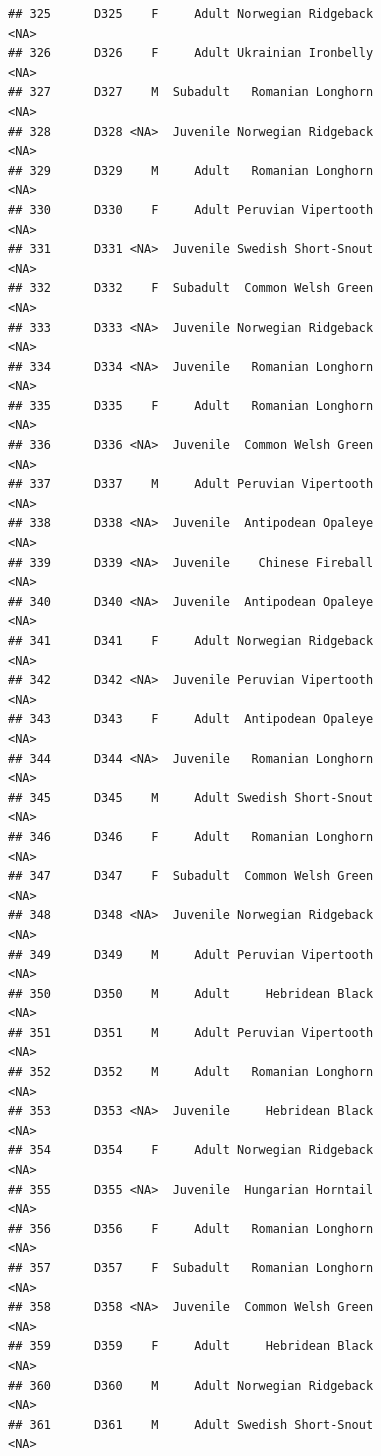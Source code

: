 \documentclass[
]{book}
\begin{document}
\begin{verbatim}
## 325      D325    F     Adult Norwegian Ridgeback                <NA>
## 326      D326    F     Adult Ukrainian Ironbelly                <NA>
## 327      D327    M  Subadult   Romanian Longhorn                <NA>
## 328      D328 <NA>  Juvenile Norwegian Ridgeback                <NA>
## 329      D329    M     Adult   Romanian Longhorn                <NA>
## 330      D330    F     Adult Peruvian Vipertooth                <NA>
## 331      D331 <NA>  Juvenile Swedish Short-Snout                <NA>
## 332      D332    F  Subadult  Common Welsh Green                <NA>
## 333      D333 <NA>  Juvenile Norwegian Ridgeback                <NA>
## 334      D334 <NA>  Juvenile   Romanian Longhorn                <NA>
## 335      D335    F     Adult   Romanian Longhorn                <NA>
## 336      D336 <NA>  Juvenile  Common Welsh Green                <NA>
## 337      D337    M     Adult Peruvian Vipertooth                <NA>
## 338      D338 <NA>  Juvenile  Antipodean Opaleye                <NA>
## 339      D339 <NA>  Juvenile    Chinese Fireball                <NA>
## 340      D340 <NA>  Juvenile  Antipodean Opaleye                <NA>
## 341      D341    F     Adult Norwegian Ridgeback                <NA>
## 342      D342 <NA>  Juvenile Peruvian Vipertooth                <NA>
## 343      D343    F     Adult  Antipodean Opaleye                <NA>
## 344      D344 <NA>  Juvenile   Romanian Longhorn                <NA>
## 345      D345    M     Adult Swedish Short-Snout                <NA>
## 346      D346    F     Adult   Romanian Longhorn                <NA>
## 347      D347    F  Subadult  Common Welsh Green                <NA>
## 348      D348 <NA>  Juvenile Norwegian Ridgeback                <NA>
## 349      D349    M     Adult Peruvian Vipertooth                <NA>
## 350      D350    M     Adult     Hebridean Black                <NA>
## 351      D351    M     Adult Peruvian Vipertooth                <NA>
## 352      D352    M     Adult   Romanian Longhorn                <NA>
## 353      D353 <NA>  Juvenile     Hebridean Black                <NA>
## 354      D354    F     Adult Norwegian Ridgeback                <NA>
## 355      D355 <NA>  Juvenile  Hungarian Horntail                <NA>
## 356      D356    F     Adult   Romanian Longhorn                <NA>
## 357      D357    F  Subadult   Romanian Longhorn                <NA>
## 358      D358 <NA>  Juvenile  Common Welsh Green                <NA>
## 359      D359    F     Adult     Hebridean Black                <NA>
## 360      D360    M     Adult Norwegian Ridgeback                <NA>
## 361      D361    M     Adult Swedish Short-Snout                <NA>

\end{verbatim}
\end{document}
